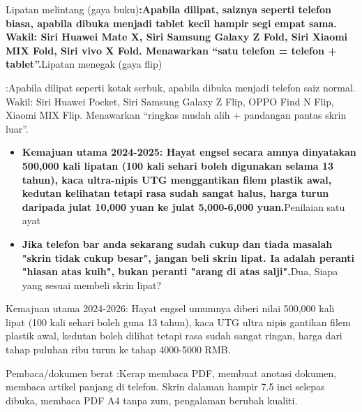 


Lipatan melintang (gaya buku)\textbf{:Apabila dilipat, saiznya seperti telefon biasa, apabila dibuka menjadi tablet kecil hampir segi empat sama. Wakil: Siri Huawei Mate X, Siri Samsung Galaxy Z Fold, Siri Xiaomi MIX Fold, Siri vivo X Fold. Menawarkan “satu telefon = telefon + tablet”.}Lipatan menegak (gaya flip)

:Apabila dilipat seperti kotak serbuk, apabila dibuka menjadi telefon saiz normal. Wakil: Siri Huawei Pocket, Siri Samsung Galaxy Z Flip, OPPO Find N Flip, Xiaomi MIX Flip. Menawarkan “ringkas mudah alih + pandangan pantas skrin luar”.

\begin{itemize}
  \item \textbf{Kemajuan utama 2024-2025: Hayat engsel secara amnya dinyatakan 500,000 kali lipatan (100 kali sehari boleh digunakan selama 13 tahun), kaca ultra-nipis UTG menggantikan filem plastik awal, kedutan kelihatan tetapi rasa sudah sangat halus, harga turun daripada julat 10,000 yuan ke julat 5,000-6,000 yuan.}Penilaian satu ayat
  \item \textbf{Jika telefon bar anda sekarang sudah cukup dan tiada masalah "skrin tidak cukup besar", jangan beli skrin lipat. Ia adalah peranti "hiasan atas kuih", bukan peranti "arang di atas salji".}Dua, Siapa yang sesuai membeli skrin lipat?
\end{itemize}

Kemajuan utama 2024-2026: Hayat engsel umumnya diberi nilai 500,000 kali lipat (100 kali sehari boleh guna 13 tahun), kaca UTG ultra nipis gantikan filem plastik awal, kedutan boleh dilihat tetapi rasa sudah sangat ringan, harga dari tahap puluhan ribu turun ke tahap 4000-5000 RMB.

\begin{tcbinfo}{Pembaca/dokumen berat}
:Kerap membaca PDF, membuat anotasi dokumen, membaca artikel panjang di telefon. Skrin dalaman hampir 7.5 inci selepas dibuka, membaca PDF A4 tanpa zum, pengalaman berubah kualiti.

\end{tcbinfo}


